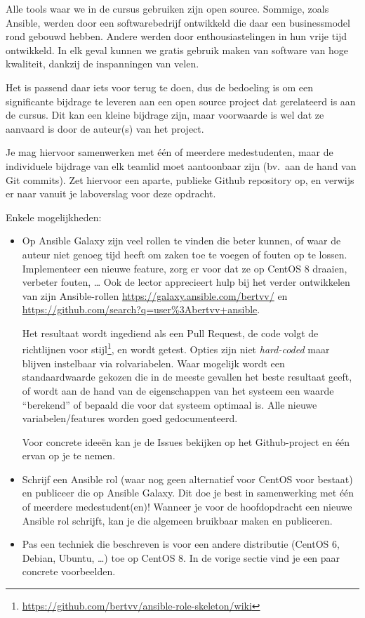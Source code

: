 Alle tools waar we in de cursus gebruiken zijn open source. Sommige, zoals Ansible, werden door een softwarebedrijf ontwikkeld die daar een businessmodel rond gebouwd hebben. Andere werden door enthousiastelingen in hun vrije tijd ontwikkeld. In elk geval kunnen we gratis gebruik maken van software van hoge kwaliteit, dankzij de inspanningen van velen.

Het is passend daar iets voor terug te doen, dus de bedoeling is om een significante bijdrage te leveren aan een open source project dat gerelateerd is aan de cursus. Dit kan een kleine bijdrage zijn, maar voorwaarde is wel dat ze aanvaard is door de auteur(s) van het project.

Je mag hiervoor samenwerken met één of meerdere medestudenten, maar de individuele bijdrage van elk teamlid moet aantoonbaar zijn (bv.\ aan de hand van Git commits). Zet hiervoor een aparte, publieke Github repository op, en verwijs er naar vanuit je laboverslag voor deze opdracht.

Enkele mogelijkheden:

\begin{itemize}
  \item Op Ansible Galaxy zijn veel rollen te vinden die beter kunnen, of waar de auteur niet genoeg tijd heeft om zaken toe te voegen of fouten op te lossen. Implementeer een nieuwe feature, zorg er voor dat ze op CentOS 8 draaien, verbeter fouten, \ldots{} Ook de lector apprecieert hulp bij het verder ontwikkelen van zijn Ansible-rollen \url{https://galaxy.ansible.com/bertvv/} en \url{https://github.com/search?q=user\%3Abertvv+ansible}.

  Het resultaat wordt ingediend als een Pull Request, de code volgt de richtlijnen voor stijl\footnote{\url{https://github.com/bertvv/ansible-role-skeleton/wiki}}, en wordt getest. Opties zijn niet \emph{hard-coded} maar blijven instelbaar via rolvariabelen. Waar mogelijk wordt een standaardwaarde gekozen die in de meeste gevallen het beste resultaat geeft, of wordt aan de hand van de eigenschappen van het systeem een waarde ``berekend'' of bepaald die voor dat systeem optimaal is. Alle nieuwe variabelen/features worden goed gedocumenteerd.
  
  Voor concrete ideeën kan je de Issues bekijken op het Github-project en één ervan op je te nemen.

  \item Schrijf een Ansible rol (waar nog geen alternatief voor CentOS voor bestaat) en publiceer die op Ansible Galaxy. Dit doe je best in samenwerking met één of meerdere medestudent(en)! Wanneer je voor de hoofdopdracht een nieuwe Ansible rol schrijft, kan je die algemeen bruikbaar maken en publiceren.
  
  \item Pas een techniek die beschreven is voor een andere distributie (CentOS 6, Debian, Ubuntu, \ldots{}) toe op CentOS 8. In de vorige sectie vind je een paar concrete voorbeelden.
\end{itemize}

